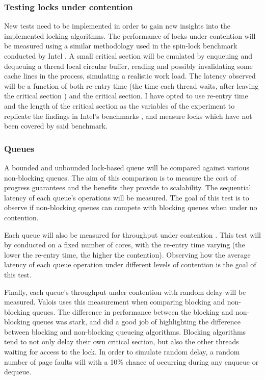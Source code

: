 \documentclass[a4paper, 12pt, titlepage]{article}
\begin{document}
\begin{onehalfspacing}
\subsubsection{Testing locks under contention}
New tests need to be implemented in order to gain new insights into the implemented locking algorithms. The performance of locks under contention will be measured using a similar methodology used in the spin-lock benchmark conducted by Intel \cite{intelxeonlockscaling}. A small critical section will be emulated by enqueuing and dequeuing a thread local circular buffer, reading and possibly invalidating some cache lines in the process, simulating a realistic work load. The latency observed will be a function of both re-entry time (the time each thread waits, after leaving the critical section \cite{intelxeonlockscaling}) and the critical section. I have opted to use re-entry time and the length of the critical section as the variables of the experiment to replicate the findings in Intel's benchmarks \cite{intelxeonlockscaling}, and measure locks which have not been covered by said benchmark.

\subsubsection{Queues}
A bounded and unbounded lock-based queue \cite[Section~10.2]{herlihy2020art} will be compared against various non-blocking queues. The aim of this comparison is to measure the cost of progress guarantees\cite{herlihy2020art, mckenney2017parallel} and the benefits they provide to scalability. The sequential latency of each queue's operations will be measured. The goal of this test is to observe if non-blocking queues can compete with blocking queues when under no contention.

Each queue will also be measured for throughput under contention \cite{valois1995lock,michael1996simple,kogan2011wait}. This test will by conducted on a fixed number of cores, with the re-entry time varying (the lower the re-entry time, the higher the contention). Observing how the average latency of each queue operation under different levels of contention is the goal of this test.

Finally, each queue's throughput under contention with random delay will be measured. Valois uses this measurement \cite{valois1995lock} when comparing blocking and non-blocking queues. The difference in performance between the blocking and non-blocking queues was stark, and did a good job of highlighting the difference between blocking and non-blocking queueing algorithms. Blocking algorithms tend to not only delay their own critical section, but also the other threads waiting for access to the lock. In order to simulate random delay, a random number of page faults will with a 10\% chance of occurring during any enqueue or dequeue.


\end{onehalfspacing}
\end{document}
